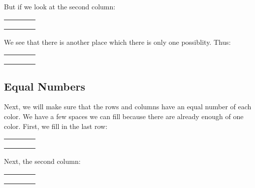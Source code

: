 \documentclass{article}
\begin{document}
But if we look at the second column:

\begin{center}
\begin{tabular}{|l|l|l|l|}
\hline
 \\ \hline
 \cellcolor{red} \\ \hline
  \\ \hline
\cellcolor{red}\\ \hline
\end{tabular}
\end{center}

We see that there is another place which there is only one possiblity.
Thus:

\begin{center}
\begin{tabular}{|l|l|l|l|}
\hline
\cellcolor{blue} & & & 							\\ \hline
 & \cellcolor{red} & & 							\\ \hline
 & \cellcolor{blue} & & 						\\ \hline
 & \cellcolor{red} & \cellcolor{blue} & \cellcolor{red} 	\\ \hline
\end{tabular}
\end{center}

\subsection{Equal Numbers}
Next, we will make sure that the rows and columns have an equal number of each color.
We have a few spaces we can fill because there are already enough of one color.
First, we fill in the last row:

\begin{center}
\begin{tabular}{|l|l|l|l|}
\hline
\cellcolor{blue} & & & 							\\ \hline
 & \cellcolor{red} & & 							\\ \hline
 & \cellcolor{blue} & & 						\\ \hline
\cellcolor{blue} & \cellcolor{red} & \cellcolor{blue} & \cellcolor{red} 	\\ \hline
\end{tabular}
\end{center}

Next, the second column:

\begin{center}
\begin{tabular}{|l|l|l|l|}
\hline
\cellcolor{blue} & \cellcolor{blue} & & 							\\ \hline
 & \cellcolor{red} & & 							\\ \hline
 & \cellcolor{blue} & & 						\\ \hline
\cellcolor{blue} & \cellcolor{red} & \cellcolor{blue} & \cellcolor{red} 	\\ \hline
\end{tabular}
\end{center}
\end{document}
